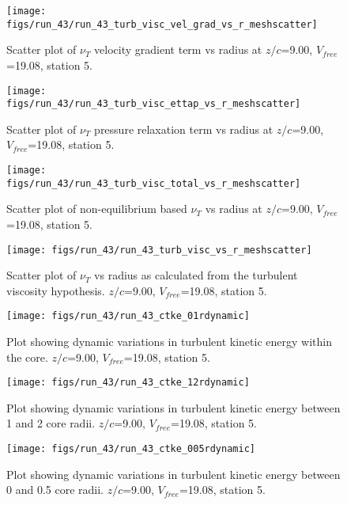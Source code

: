 \begin{figure}[H]
\centering
\texttt{[image: figs/run\_43/run\_43\_turb\_visc\_vel\_grad\_vs\_r\_meshscatter]}
\caption{Scatter plot of $\nu_T$ velocity gradient term vs radius at $z/c$=9.00, $V_{free}$=19.08, station 5.}
\end{figure}


\begin{figure}[H]
\centering
\texttt{[image: figs/run\_43/run\_43\_turb\_visc\_ettap\_vs\_r\_meshscatter]}
\caption{Scatter plot of $\nu_T$ pressure relaxation term vs radius at $z/c$=9.00, $V_{free}$=19.08, station 5.}
\end{figure}


\begin{figure}[H]
\centering
\texttt{[image: figs/run\_43/run\_43\_turb\_visc\_total\_vs\_r\_meshscatter]}
\caption{Scatter plot of non-equilibrium based $\nu_T$ vs radius at $z/c$=9.00, $V_{free}$=19.08, station 5.}
\end{figure}


\begin{figure}[H]
\centering
\texttt{[image: figs/run\_43/run\_43\_turb\_visc\_vs\_r\_meshscatter]}
\caption{Scatter plot of $\nu_T$ vs radius as calculated from the turbulent viscosity hypothesis. $z/c$=9.00, $V_{free}$=19.08, station 5.}
\end{figure}


\begin{figure}[H]
\centering
\texttt{[image: figs/run\_43/run\_43\_ctke\_01rdynamic]}
\caption{Plot showing dynamic variations in turbulent kinetic energy within the core. $z/c$=9.00, $V_{free}$=19.08, station 5.}
\end{figure}


\begin{figure}[H]
\centering
\texttt{[image: figs/run\_43/run\_43\_ctke\_12rdynamic]}
\caption{Plot showing dynamic variations in turbulent kinetic energy between 1 and 2 core radii. $z/c$=9.00, $V_{free}$=19.08, station 5.}
\end{figure}


\begin{figure}[H]
\centering
\texttt{[image: figs/run\_43/run\_43\_ctke\_005rdynamic]}
\caption{Plot showing dynamic variations in turbulent kinetic energy between 0 and 0.5 core radii. $z/c$=9.00, $V_{free}$=19.08, station 5.}
\end{figure}


